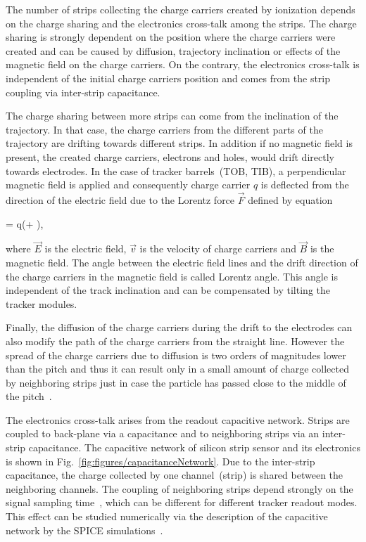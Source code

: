 The number of strips collecting the charge carriers created by ionization depends on the charge sharing and the electronics cross-talk among the strips. The charge sharing is strongly dependent on the position where the charge carriers were created and can be caused by diffusion, trajectory inclination or effects of the magnetic field on the charge carriers. On the contrary, the electronics cross-talk is independent of the initial charge carriers position and comes from the strip coupling via inter-strip capacitance.  

The charge sharing between more strips can come from the inclination of the trajectory. In that case, the charge carriers from the different parts of the trajectory are drifting towards different strips. In addition if no magnetic field is present, the created charge carriers, electrons and holes, would drift directly towards electrodes. In the case of tracker barrels~(TOB, TIB), a perpendicular magnetic field is applied  and consequently charge carrier $q$ is deflected from the direction of the electric field due to the Lorentz force $\vec{F}$ defined by equation

{
   =  q(+ \times {}),
}

where $\vec{E}$ is the electric field, $\vec{v}$ is the velocity of charge carriers and $\vec{B}$ is the magnetic field. The angle between the electric field lines and the drift direction of the charge carriers in the magnetic field is called Lorentz angle. This angle is independent of the track inclination and can be compensated by tilting the tracker modules.

Finally, the diffusion of the charge carriers during the drift to the electrodes can also modify the path of the charge carriers from the straight line. However the spread of the charge carriers due to diffusion is two orders of magnitudes lower than the pitch and thus it can result only in a small amount of charge collected by neighboring strips just in case the particle has passed close to the middle of the pitch~\cite{Bloch:2007zza}.


The electronics cross-talk arises from the readout capacitive network. Strips are coupled to back-plane via a capacitance and to neighboring strips via an inter-strip capacitance. The capacitive network of silicon strip sensor and its electronics is shown in Fig.~\ref{fig:figures/capacitanceNetwork}. Due to the inter-strip capacitance, the charge collected by one channel~(strip) is shared between the neighboring channels. The coupling of neighboring strips depend strongly on the signal sampling time~\cite{Bloch:2007zza}, which can be different for different tracker readout modes. This effect can be studied numerically via the description of the capacitive network by the SPICE simulations~\cite{Barberis:1993ph}.


